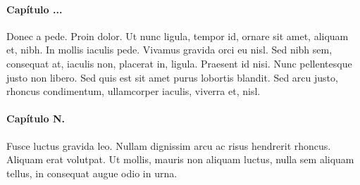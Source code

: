 \paragraph*{Capítulo ...}
Donec a pede. Proin dolor. Ut nunc ligula, tempor id, ornare sit amet, aliquam et, nibh. In mollis iaculis pede. Vivamus gravida orci eu nisl. Sed nibh sem, consequat at, iaculis non, placerat in, ligula. Praesent id nisi. Nunc pellentesque justo non libero. Sed quis est sit amet purus lobortis blandit. Sed arcu justo, rhoncus condimentum, ullamcorper iaculis, viverra et, nisl.

\paragraph*{Capítulo N.}
Fusce luctus gravida leo. Nullam dignissim arcu ac risus hendrerit rhoncus. Aliquam erat volutpat. Ut mollis, mauris non aliquam luctus, nulla sem aliquam tellus, in consequat augue odio in urna.




